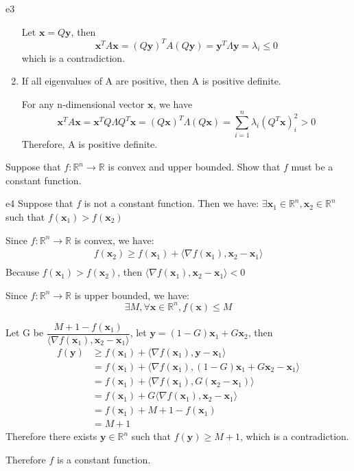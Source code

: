 \documentclass{article}
\newcommand{\RBB}{\mathbb{R}}
\newcommand{\xB}{\mathbf{x}}
\newcommand{\yB}{\mathbf{y}}
\begin{document}
\begin{PROOF}{e3}
\begin{enumerate}
		Let $\xB = Q \yB$, then
		\[
			\xB^T A \xB = (Q\yB)^T A (Q\yB) = \yB^T \Lambda \yB = \lambda_i \leq 0	
		\]
		which is a contradiction.
		
		\item If all eigenvalues of A are positive, then A is positive definite.
		
		For any n-dimensional vector $\xB$, we have
		\[
		\xB^T A \xB = \xB^T Q \Lambda Q^T \xB = (Q\xB)^T \Lambda (Q\xB) = \sum_{i=1}^n \lambda_i (Q^T \xB)_i^2 > 0
		\]
		Therefore, A is positive definite.
	\end{enumerate}
\end{PROOF}
\newpage
\begin{excercise}\label{e4}
Suppose that $f : \mathbb{R}^n \rightarrow \mathbb{R}$ is convex and upper bounded. Show that $f$ must
be a constant function.
\end{excercise}

\begin{PROOF}{e4}
	Suppose that $f$ is not a constant function. Then we have: $\exists \xB_1 \in \RBB^n, \xB_2 \in \RBB^n$ such that $f(\xB_1) > f(\xB_2)$ 

	Since $f : \mathbb{R}^n \rightarrow \mathbb{R}$ is convex, we have:
	\[
	\begin{aligned}
		f(\xB_2) \geq f(\xB_1) + \langle \nabla f(\xB_1), \xB_2 - \xB_1\rangle \\
	\end{aligned}
	\]
	Because $f(\xB_1) > f(\xB_2)$, then $\langle \nabla f(\xB_1), \xB_2 - \xB_1\rangle < 0$

	Since $f : \mathbb{R}^n \rightarrow \mathbb{R}$ is upper bounded, we have:
	\[
		\exists M, \forall \xB \in \RBB^n, f(\xB) \leq M
	\]
	
	Let G be $\dfrac{M+1-f(\xB_1)}{\langle \nabla f(\xB_1), \xB_2 - \xB_1\rangle }$, let $\yB = (1- G)\xB_1 + G \xB_2$, then
	\[
		\begin{aligned}
			f(\yB) &\geq f(\xB_1) + \langle \nabla f(\xB_1), \yB - \xB_1\rangle \\
			&= f(\xB_1) + \langle \nabla f(\xB_1), (1- G)\xB_1 + G \xB_2 - \xB_1\rangle \\
			&= f(\xB_1) + \langle \nabla f(\xB_1), G(\xB_2 - \xB_1) \rangle\\
			&= f(\xB_1) + G \langle \nabla f(\xB_1), \xB_2 - \xB_1\rangle\\
			&= f(\xB_1) + M + 1 - f(\xB_1) \\
			&= M + 1
		\end{aligned}
	\]
	Therefore there exists $\yB \in \RBB^n$ such that $f(\yB) \geq M + 1$, which is a contradiction.

	Therefore $f$ is a constant function.
\end{PROOF}
\end{document}
